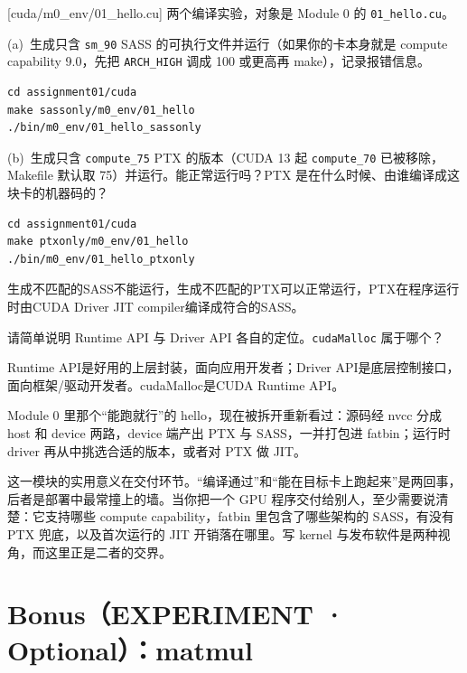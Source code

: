 \documentclass[11pt,a4paper,fontset=none]{ctexart}
\begin{document}
[cuda/m0\_env/01\_hello.cu]
两个编译实验，对象是 Module 0 的 \texttt{01\_hello.cu}。

(a)~生成只含 \texttt{sm\_90} SASS 的可执行文件并运行（如果你的卡本身就是 compute capability 9.0，先把 \texttt{ARCH\_HIGH} 调成 100 或更高再 make），记录报错信息。

\begin{lstlisting}
cd assignment01/cuda
make sassonly/m0_env/01_hello
./bin/m0_env/01_hello_sassonly
\end{lstlisting}

(b)~生成只含 \texttt{compute\_75} PTX 的版本（CUDA 13 起 \texttt{compute\_70} 已被移除，Makefile 默认取 75）并运行。能正常运行吗？PTX 是在什么时候、由谁编译成这块卡的机器码的？

\begin{lstlisting}
cd assignment01/cuda
make ptxonly/m0_env/01_hello
./bin/m0_env/01_hello_ptxonly
\end{lstlisting}

生成不匹配的SASS不能运行，生成不匹配的PTX可以正常运行，PTX在程序运行时由CUDA Driver JIT compiler编译成符合的SASS。

请简单说明 Runtime API 与 Driver API 各自的定位。\texttt{cudaMalloc} 属于哪个？

Runtime API是好用的上层封装，面向应用开发者；Driver API是底层控制接口，面向框架/驱动开发者。cudaMalloc是CUDA Runtime API。

\begin{lookback}
Module 0 里那个“能跑就行”的 hello，现在被拆开重新看过：源码经 nvcc 分成 host 和 device 两路，device 端产出 PTX 与 SASS，一并打包进 fatbin；运行时 driver 再从中挑选合适的版本，或者对 PTX 做 JIT。

这一模块的实用意义在交付环节。“编译通过”和“能在目标卡上跑起来”是两回事，后者是部署中最常撞上的墙。当你把一个 GPU 程序交付给别人，至少需要说清楚：它支持哪些 compute capability，fatbin 里包含了哪些架构的 SASS，有没有 PTX 兜底，以及首次运行的 JIT 开销落在哪里。写 kernel 与发布软件是两种视角，而这里正是二者的交界。
\end{lookback}

\clearpage
\section*{Bonus（EXPERIMENT · Optional）：matmul}
\end{document}
